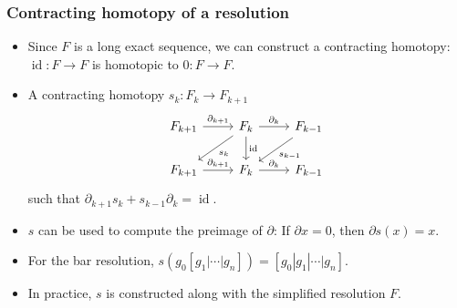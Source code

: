 \documentclass[xcolor=table, aspectratio=169]{beamer}
\DeclareMathOperator{\id}{id}
\begin{document}
\begin{frame}[fragile]
	\frametitle{Contracting homotopy of a resolution}
	\begin{itemize}
		\item Since $F$ is a long exact sequence, we can construct a contracting homotopy: $\id:F\rightarrow F$ is homotopic to $0:F\rightarrow F$.
		\item A contracting homotopy $s_k: F_k\rightarrow F_{k+1}$
		\[
		\begin{tikzcd}
		F_{k+1} \arrow[r,"\partial_{k+1}"]
		&F_k\arrow[r,"\partial_k"]
		\arrow[d,"\id"]
		\arrow[ld,"s_k"]&
		F_{k-1}\arrow[ld,"s_{k-1}"]\\
		F_{k+1} \arrow[r,"\partial_{k+1}"]& F_k\arrow[r,"\partial_k"]&
		F_{k-1}
		\end{tikzcd}
		\]
		such that $\partial_{k+1}s_k + s_{k-1}\partial_k = \id$.
		\item $s$ can be used to compute the preimage of $\partial$: If $\partial x=0$, then $\partial s(x) = x$.
		\item For the bar resolution, $s(g_0[g_1|\cdots|g_n])
		=[g_0|g_1|\cdots|g_n]$.
		\item In practice, $s$ is constructed along with the simplified resolution $F$.
	\end{itemize}
\end{frame}
\end{document}
